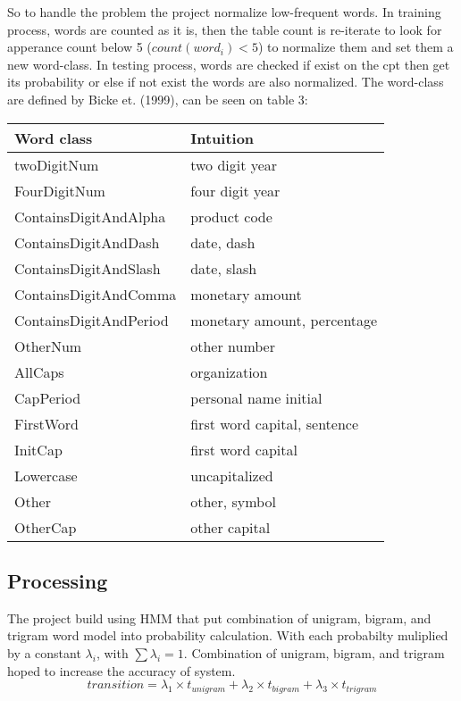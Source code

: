 \documentclass[conference,compsoc]{IEEEtran}
\begin{document}
So to handle the problem the project normalize low-frequent words. In training process, words are counted as it is, then the table count is re-iterate to look for apperance count below 5 ($count(word_i)<5$) to normalize them and set them a new word-class. In testing process, words are checked if exist on the cpt then get its probability or else if not exist the words are also normalized. The word-class are defined by Bicke et. (1999), can be seen on table 3:
\begin{center}
	\begin{tabular}{|l|l|}
		\hline
			\bf Word class & \bf Intuition\\
		\hline
		twoDigitNum & two digit year \\
	    FourDigitNum & four digit year \\
	    ContainsDigitAndAlpha & product code \\
	    ContainsDigitAndDash & date, dash \\
	    ContainsDigitAndSlash & date, slash \\
	    ContainsDigitAndComma & monetary amount \\
	    ContainsDigitAndPeriod & monetary amount, percentage \\
	    OtherNum & other number \\
	    AllCaps & organization \\
	    CapPeriod & personal name initial \\
	    FirstWord & first word capital, sentence \\
	    InitCap & first word capital \\
	    Lowercase & uncapitalized \\
	    Other & other, symbol \\
	    OtherCap & other capital \\
		\hline	
	\end{tabular} 
\end{center}

\subsection{Processing}
The project build using HMM that put combination of unigram, bigram, and trigram word model into probability calculation. With each probabilty muliplied by a constant $\lambda_i$, with $\sum \lambda_i = 1$. Combination of unigram, bigram, and trigram hoped to increase the accuracy of system.
\[ transition = \lambda_1 \times t_{unigram} + \lambda_2 \times t_{bigram} + \lambda_3 \times t_{trigram} \]
\end{document}
